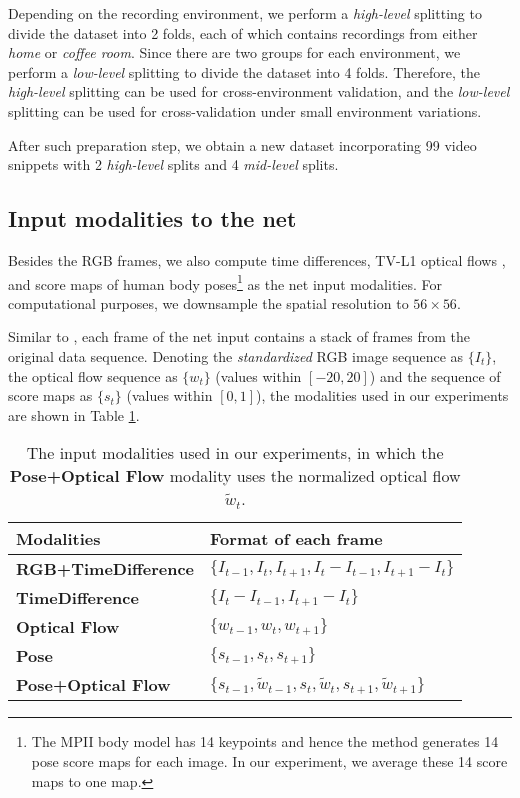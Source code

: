 \documentclass[runningheads]{llncs}
\begin{document}
Depending on the recording environment, we perform a {\em high-level} splitting to divide the dataset into 2 folds, each of which contains recordings from either {\em home} or {\em coffee room}. Since there are two groups for each environment, we perform a {\em low-level} splitting to divide the dataset into 4 folds. Therefore, the {\em high-level} splitting can be used for cross-environment validation, and the {\em low-level} splitting can be used for cross-validation under small environment variations. 

After such preparation step, we obtain a new dataset incorporating 99 video snippets with 2 {\em high-level} splits and 4 {\em mid-level} splits.


\subsection{Input modalities to the net}
Besides the RGB frames, we also compute time differences, TV-L1 optical flows \cite{chambolle2004algorithm}, and score maps of human body poses\footnote{The MPII body model has 14 keypoints and hence the method generates 14 pose score maps for each image. In our experiment, we average these 14 score maps to one map.} \cite{insafutdinov2016eccv} \cite{insafutdinov2017cvpr} as the net input modalities. For computational purposes, we downsample the spatial resolution to $56 \times 56$. 


Similar to \cite{Lea_2017_CVPR}, each frame of the net input contains a stack of frames from the original data sequence. Denoting the {\em standardized} RGB image sequence as $\{I_t\}$, the optical flow sequence as $\{w_t\}$ (values within $[-20,20]$) and the sequence of score maps as $\{s_t\}$ (values within $[0,1]$), the modalities used in our experiments are shown in Table \ref{tab:modalities}. 

\begin{table}
\centering
\caption{The input modalities used in our experiments, in which the {\bf Pose+Optical Flow} modality uses the normalized optical flow $\tilde{w}_{t}$.}
\label{tab:modalities}
\begin{tabular}{l|l}

{\sf Modalities} & {\sf Format of each frame}\\
\hline{\bf RGB+TimeDifference} & $\{ I_{t-1},I_{t},I_{t+1}, I_{t}-I_{t-1}, I_{t+1}-I_{t} \}$\\{\bf TimeDifference} &  $\{ I_{t}-I_{t-1}, I_{t+1}-I_{t} \}$\\{\bf Optical Flow} &  $\{  w_{t-1}, w_{t}, w_{t+1} \}$\\{\bf Pose} & $\{ s_{t-1}, s_{t}, s_{t+1} \}$\\{\bf Pose+Optical Flow} & $\{ s_{t-1}, \tilde{w}_{t-1}, s_t, \tilde{w}_t, s_{t+1}, \tilde{w}_{t+1} \}$\\
\end{tabular}

\end{table}
\end{document}
